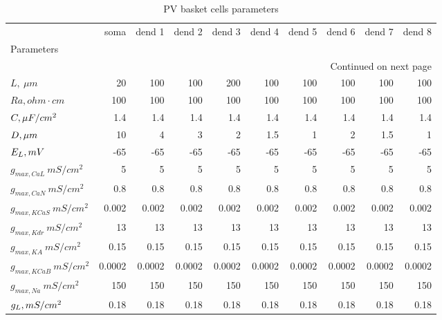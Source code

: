 {\footnotesize
\begin{longtable}{lrrrrrrrrr}
\caption{PV basket cells parameters}\label{ca1_pvbas_cell_parameters}\\
\toprule
{} &   soma & dend 1 & dend 2 & dend 3 & dend 4 & dend 5 & dend 6 & dend 7 & dend 8 \\
Parameters       &        &        &        &        &        &        &        &        &        \\
\midrule
\endhead
\midrule
\multicolumn{10}{r}{{Continued on next page}} \\
\midrule
\endfoot

\bottomrule
\endlastfoot
$L, \ \mu m$ &     20 &    100 &    100 &    200 &    100 &    100 &    100 &    100 &    100 \\
$Ra,
 ohm \cdot cm$               &    100 &    100 &    100 &    100 &    100 &    100 &    100 &    100 &    100 \\
$C, \linebreak \mu F / cm^2$               &    1.4 &    1.4 &    1.4 &    1.4 &    1.4 &    1.4 &    1.4 &    1.4 &    1.4 \\
$D,\linebreak \mu m$             &     10 &      4 &      3 &      2 &    1.5 &      1 &      2 &    1.5 &      1 \\
$E_L, \linebreak mV$        &    -65 &    -65 &    -65 &    -65 &    -65 &    -65 &    -65 &    -65 &    -65 \\
$g_{max, CaL     }\  mS / cm^2$&      5 &      5 &      5 &      5 &      5 &      5 &      5 &      5 &      5 \\
$g_{max, CaN     }\  mS / cm^2$&    0.8 &    0.8 &    0.8 &    0.8 &    0.8 &    0.8 &    0.8 &    0.8 &    0.8 \\
$g_{max, KCaS     }\  mS / cm^2$&  0.002 &  0.002 &  0.002 &  0.002 &  0.002 &  0.002 &  0.002 &  0.002 &  0.002 \\
$g_{max, Kdr  }\  mS / cm^2$&     13 &     13 &     13 &     13 &     13 &     13 &     13 &     13 &     13 \\
$g_{max, KA      }\  mS / cm^2$&   0.15 &   0.15 &   0.15 &   0.15 &   0.15 &   0.15 &   0.15 &   0.15 &   0.15 \\
$g_{max, KCaB    }\  mS / cm^2$& 0.0002 & 0.0002 & 0.0002 & 0.0002 & 0.0002 & 0.0002 & 0.0002 & 0.0002 & 0.0002 \\
$g_{max, Na }\  mS / cm^2$&    150 &    150 &    150 &    150 &    150 &    150 &    150 &    150 &    150 \\
$g_L, \linebreak mS / cm^2$     &   0.18 &   0.18 &   0.18 &   0.18 &   0.18 &   0.18 &   0.18 &   0.18 &   0.18 \\
\end{longtable}
}